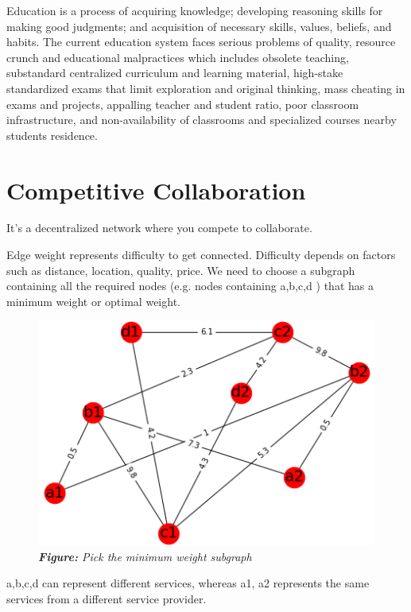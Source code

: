 \documentclass[a4paper,12pt,twoside]{extarticle}
\newlength{\lengthwidth}
\begin{document}
\begin{adjustwidth}{11em}{}
 Education is a process of acquiring knowledge; developing reasoning skills for making good judgments; and acquisition of necessary skills, values, beliefs, and habits.
The current education system faces serious problems of quality, resource crunch and educational malpractices which includes obsolete teaching, substandard centralized curriculum and learning material, high-stake standardized exams that limit exploration and original thinking, mass cheating in exams and projects, appalling teacher and student ratio, poor classroom infrastructure, and non-availability of classrooms and specialized courses nearby students residence.

 
 
 \section*{Competitive Collaboration}
 It's a decentralized network where you compete to collaborate.

 Edge weight represents difficulty to get connected. Difficulty depends on factors such as distance, location, quality, price.
 We need to choose a subgraph containing all the required nodes (e.g. nodes containing a,b,c,d ) that has a minimum weight or optimal weight.
 

 
 \begin{figure}[h]\begin{adjustwidth}{11em}{}\includegraphics[width=\lengthwidth]{graph.png}\begin{mdframed}[style=captionstyle]\caption*{  \scriptsize \textit{\textbf{Figure: }Pick the minimum weight subgraph}}\end{mdframed}\end{adjustwidth}\end{figure}
    a,b,c,d can represent different services, whereas a1, a2 represents the same services from a different service provider.



\end{adjustwidth}
\end{document}

